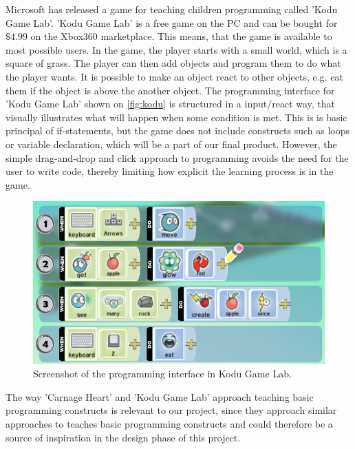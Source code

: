Microsoft has released a game for teaching children programming called 'Kodu Game Lab'.\cite{kodu}
'Kodu Game Lab' is a free game on the PC and can be bought for $\$4.99$ on the Xbox360 marketplace.
This means, that the game is available to most possible users.
In the game, the player starts with a small world, which is a square of grass.
The player can then add objects and program them to do what the player wants.
It is possible to make an object react to other objects, e.g. eat them if the object is above the another object.
The programming interface for 'Kodu Game Lab' shown on \autoref{fig:kodu} is structured in a input/react way, that visually illustrates what will happen when some condition is met. This is is basic principal of if-statements, but the game does not include constructs such as loops or variable declaration, which will be a part of our final product. However, the simple drag-and-drop and click approach to programming avoids the need for the user to write code, thereby limiting how explicit the learning process is in the game.

\begin{figure}[ht]
  \centering
    \includegraphics[width=\textwidth]{img/kodu.png}
  \caption{Screenshot of the programming interface in Kodu Game Lab.}
  \label{fig:kodu}
\end{figure}

The way 'Carnage Heart' and 'Kodu Game Lab' approach teaching basic programming constructs is relevant to our project, since they approach similar approaches to teaches basic programming constructs and could therefore be a source of inspiration in the design phase of this project.